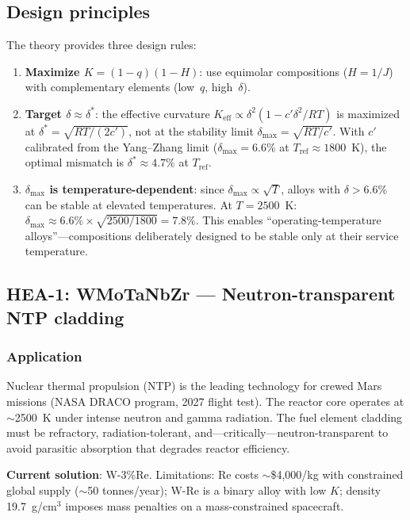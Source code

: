 \documentclass[12pt,letterpaper]{article}
\theoremstyle{definition}
\begin{document}
\subsection{Design principles}

The theory provides three design rules:

\begin{enumerate}
  \item \textbf{Maximize $K = (1-q)(1-H)$}: use equimolar compositions ($H = 1/J$) with complementary elements (low~$q$, high~$\delta$).
  \item \textbf{Target $\delta \approx \delta^*$}: the effective curvature $K_{\mathrm{eff}} \propto \delta^2(1 - c'\delta^2/RT)$ is maximized at $\delta^* = \sqrt{RT/(2c')}$, not at the stability limit $\delta_{\max} = \sqrt{RT/c'}$.  With $c'$ calibrated from the Yang--Zhang limit ($\delta_{\max} = 6.6\%$ at $T_{\mathrm{ref}} \approx 1800$~K), the optimal mismatch is $\delta^* \approx 4.7\%$ at $T_{\mathrm{ref}}$.
  \item \textbf{$\delta_{\max}$ is temperature-dependent}: since $\delta_{\max} \propto \sqrt{T}$, alloys with $\delta > 6.6\%$ can be stable at elevated temperatures.  At $T = 2500$~K: $\delta_{\max} \approx 6.6\% \times \sqrt{2500/1800} = 7.8\%$.  This enables ``operating-temperature alloys''---compositions deliberately designed to be stable only at their service temperature.
\end{enumerate}


\subsection{HEA-1: WMoTaNbZr --- Neutron-transparent NTP cladding}

\subsubsection{Application}

Nuclear thermal propulsion (NTP) is the leading technology for crewed Mars missions (NASA DRACO program, 2027 flight test).  The reactor core operates at $\sim$2500~K under intense neutron and gamma radiation.  The fuel element cladding must be refractory, radiation-tolerant, and---critically---neutron-transparent to avoid parasitic absorption that degrades reactor efficiency.

\textbf{Current solution}: W-3\%Re.  Limitations: Re costs $\sim$\$4,000/kg with constrained global supply ($\sim$50 tonnes/year); W-Re is a binary alloy with low $K$; density 19.7~g/cm$^3$ imposes mass penalties on a mass-constrained spacecraft.
\end{document}
